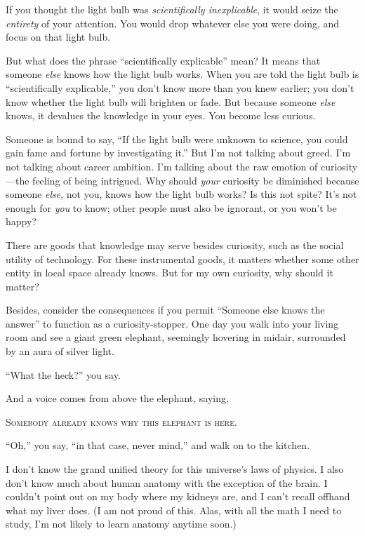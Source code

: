 {
 If you thought the light bulb was \textit{scientifically
inexplicable}, it would seize the \textit{entirety} of your attention.
You would drop whatever else you were doing, and focus on that light
bulb.}

{
 But what does the phrase ``scientifically
explicable'' mean? It means that someone
\textit{else} knows how the light bulb works. When you are told the
light bulb is ``scientifically
explicable,'' you don't know more
than you knew earlier; you don't know whether the light
bulb will brighten or fade. But because someone \textit{else} knows, it
devalues the knowledge in your eyes. You become less curious.}

{
 Someone is bound to say, ``If the light bulb were
unknown to science, you could gain fame and fortune by investigating
it.'' But I'm not talking about
greed. I'm not talking about career ambition.
I'm talking about the raw emotion of curiosity---the
feeling of being intrigued. Why should \textit{your} curiosity be
diminished because someone \textit{else}, not you, knows how the light
bulb works? Is this not spite? It's not enough for
\textit{you} to know; other people must also be ignorant, or you
won't be happy?}

{
 There are goods that knowledge may serve besides curiosity, such
as the social utility of technology. For these instrumental goods, it
matters whether some other entity in local space already knows. But for
my own curiosity, why should it matter?}

{
 Besides, consider the consequences if you permit
``Someone else knows the answer'' to
function as a curiosity-stopper. One day you walk into your living room
and see a giant green elephant, seemingly hovering in midair,
surrounded by an aura of silver light.}

{
 ``What the heck?'' you say.}

{
 And a voice comes from above the elephant, saying,}

\begin{center}
  \textsc{Somebody already knows why this elephant is here.}
\end{center}

{
 ``Oh,'' you say,
``in that case, never mind,'' and
walk on to the kitchen.}

{
 I don't know the grand unified theory for this
universe's laws of physics. I also
don't know much about human anatomy with the exception
of the brain. I couldn't point out on my body where my
kidneys are, and I can't recall offhand what my liver
does. (I am not proud of this. Alas, with all the math I need to study,
I'm not likely to learn anatomy anytime soon.)}

